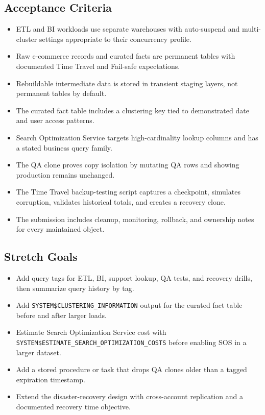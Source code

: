 \subsection*{Acceptance Criteria}
\begin{itemize}
    \item ETL and BI workloads use separate warehouses with auto-suspend and multi-cluster settings appropriate to their concurrency profile.
    \item Raw e-commerce records and curated facts are permanent tables with documented Time Travel and Fail-safe expectations.
    \item Rebuildable intermediate data is stored in transient staging layers, not permanent tables by default.
    \item The curated fact table includes a clustering key tied to demonstrated date and user access patterns.
    \item Search Optimization Service targets high-cardinality lookup columns and has a stated business query family.
    \item The QA clone proves copy isolation by mutating QA rows and showing production remains unchanged.
    \item The Time Travel backup-testing script captures a checkpoint, simulates corruption, validates historical totals, and creates a recovery clone.
    \item The submission includes cleanup, monitoring, rollback, and ownership notes for every maintained object.
\end{itemize}
\subsection*{Stretch Goals}
\begin{itemize}
    \item Add query tags for ETL, BI, support lookup, QA tests, and recovery drills, then summarize query history by tag.
    \item Add \texttt{SYSTEM\$CLUSTERING\_INFORMATION} output for the curated fact table before and after larger loads.
    \item Estimate Search Optimization Service cost with \texttt{SYSTEM\$ESTIMATE\_SEARCH\_OPTIMIZATION\_COSTS} before enabling SOS in a larger dataset.
    \item Add a stored procedure or task that drops QA clones older than a tagged expiration timestamp.
    \item Extend the disaster-recovery design with cross-account replication and a documented recovery time objective.
\end{itemize}
